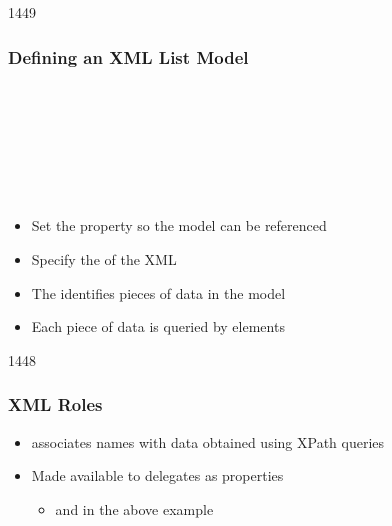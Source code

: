 \begin{slide}{1449}\frametitle{Defining an XML List Model}

\begin{qml}
\\
\\
\\
\\
\vspace*{0.5em}
\\
\\
\qtt{\}}
\end{qml}

\begin{itemize}
\item Set the  property so the model can be referenced
\item Specify the  of the XML
\item The  identifies pieces of data in the model
\item Each piece of data is queried by  elements
\end{itemize}


\end{slide}


\begin{slide}{1448}\frametitle{XML Roles}


\vspace*{1.0em}
\begin{itemize}
\item {} associates names with data obtained
      using XPath queries
\item Made available to delegates as properties
  \begin{itemize}
  \item {} and  in the above example
  \end{itemize}
\end{itemize}

\end{slide}

